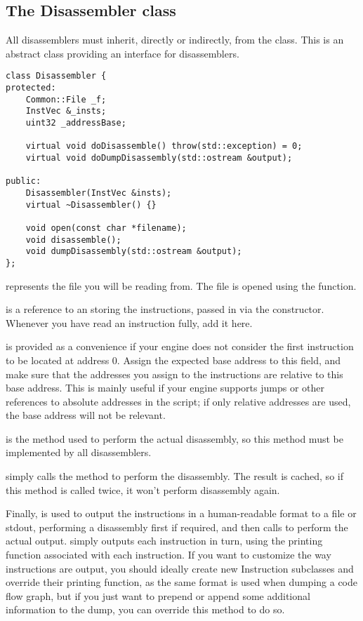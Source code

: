 \subsection{The Disassembler class}
All disassemblers must inherit, directly or indirectly, from the  class. This is an abstract class providing an interface for disassemblers.

\begin{C++}
\begin{lstlisting}
class Disassembler {
protected:
	Common::File _f;
	InstVec &_insts;
	uint32 _addressBase;

	virtual void doDisassemble() throw(std::exception) = 0;
	virtual void doDumpDisassembly(std::ostream &output);

public:
	Disassembler(InstVec &insts);
	virtual ~Disassembler() {}

	void open(const char *filename);
	void disassemble();
	void dumpDisassembly(std::ostream &output);
};
\end{lstlisting}
\end{C++}

 represents the file you will be reading from. The file is opened using the  function.

 is a reference to an  storing the instructions, passed in via the constructor. Whenever you have read an instruction fully, add it here.

 is provided as a convenience if your engine does not consider the first instruction to be located at address 0. Assign the expected base address to this field, and make sure that the addresses you assign to the instructions are relative to this base address. This is mainly useful if your engine supports jumps or other references to absolute addresses in the script; if only relative addresses are used, the base address will not be relevant.

 is the method used to perform the actual disassembly, so this method must be implemented by all disassemblers.

 simply calls the  method to perform the disassembly. The result is cached, so if this method is called twice, it won't perform disassembly again.

Finally,  is used to output the instructions in a human-readable format to a file or stdout, performing a disassembly first if required, and then calls  to perform the actual output.  simply outputs each instruction in turn, using the printing function associated with each instruction. If you want to customize the way instructions are output, you should ideally create new Instruction subclasses and override their printing function, as the same format is used when dumping a code flow graph, but if you just want to prepend or append some additional information to the dump, you can override this method to do so.

